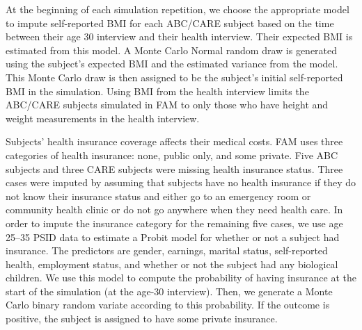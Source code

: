 \noindent At the beginning of each simulation repetition, we choose the appropriate model to impute self-reported BMI for each ABC/CARE subject based on the time between their age 30 interview and their health interview. Their expected BMI is estimated from this model. A Monte Carlo Normal random draw is generated using the subject's expected BMI and the estimated variance from the model. This Monte Carlo draw is then assigned to be the subject's initial self-reported BMI in the simulation. Using BMI from the health interview limits the ABC/CARE subjects simulated in FAM to only those who have height and weight measurements in the health interview.

\noindent Subjects' health insurance coverage affects their medical costs.
FAM uses three categories of health insurance: none, public only, and some private.
Five ABC subjects and three CARE subjects were missing health insurance status.
Three cases were imputed by assuming that subjects have no health insurance if they do not know their insurance status and either go to an emergency room or community health clinic or do not go anywhere when they need health care.
In order to impute the insurance category for the remaining five cases, we use age 25--35 PSID data to estimate a Probit model for whether or not a subject had insurance.
The predictors are gender, earnings, marital status, self-reported health, employment status, and whether or not the subject had any biological children.
We use this model to compute the probability of having insurance at the start of the simulation (at the age-30 interview).
Then, we generate a Monte Carlo binary random variate according to this probability.
If the outcome is positive, the subject is assigned to have some private insurance.

